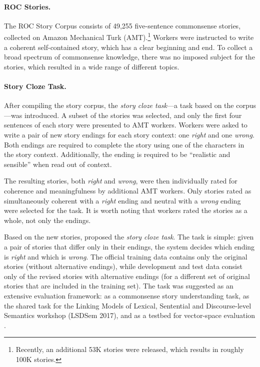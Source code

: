 \documentclass[11pt,a4paper]{article}
\newcommand{\resolved}[1]{}
\newcommand{\nascomment}[1]{{\color{blue}\textsc{[#1 --nas]}}}
\begin{document}
\paragraph{ROC Stories.}

The ROC Story Corpus consists of 49,255 five-sentence commonsense stories, collected on Amazon Mechanical Turk (AMT).\footnote{Recently, an additional 53K stories were released, which results in roughly 100K stories.}
Workers were instructed to write a coherent self-contained story, which has a clear beginning and end. 
To collect a broad spectrum of commonsense knowledge, there was no imposed subject for the stories,
which resulted in a wide range of different topics.

\paragraph{Story Cloze Task.}
After compiling the story corpus, the {\it story cloze task}---a task based on the corpus---was introduced.
A subset of the stories was selected, and only the first four sentences of each story were presented to AMT workers.
Workers were asked to write a pair of new story endings for each story context: one {\it right} and one {\it wrong}.
Both endings are required to complete the story using one of the characters in the story context. 
Additionally,  the ending is required to be ``realistic and sensible'' \cite{Mostafazadeh:2016} when read out of context.

The resulting stories, both {\it right} and {\it wrong}, were then individually rated for coherence and meaningfulness by additional AMT workers. \resolved{\nascomment{by
-  additional AMT workers? or someone else?}} 
Only stories rated as simultaneously coherent with a {\it right} ending and neutral with a {\it wrong} ending were selected for the task. 
It is worth noting that workers rated the stories as a whole, not only the endings.

Based on the new stories, \citet{Mostafazadeh:2016} proposed the {\it story cloze task}. 
The task is simple:  given a pair of stories that differ only in their endings, the system decides which ending is {\it right} and which is {\it wrong}. 
The official training data contains only the original stories (without alternative endings), while development and test data consist only of the revised stories with alternative endings (for a different set of original stories that are included in the training set). 
The task was suggested as an extensive evaluation framework:
as a commonsense story understanding task, 
as the shared task for the  Linking Models of Lexical, Sentential and Discourse-level Semantics workshop (LSDSem 2017), and as a testbed for vector-space evaluation \cite{mostafazadeh2016story}.
\end{document}
